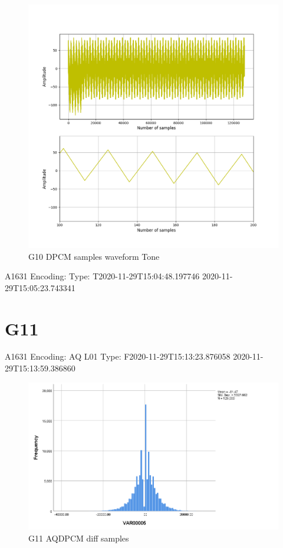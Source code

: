 \documentclass[hidelinks, 12pt, a4paper]{article}
\begin{document}
\begin{figure}[h!]
\centering
	\includegraphics[height=.38\textheight, width=\textwidth]{assets/session2/g10.png}
    \caption{G10 DPCM samples waveform Tone}
\end{figure}
A1631
Encoding: 
Type: T2020-11-29T15:04:48.197746
2020-11-29T15:05:23.743341


\section{G11}

A1631
Encoding: AQ L01
Type: F2020-11-29T15:13:23.876058
2020-11-29T15:13:59.386860
\begin{figure}[h!]
\centering
	\includegraphics[height=.38\textheight, width=\textwidth]{assets/session2/g11.png}
    \caption{G11 AQDPCM diff samples}
\end{figure}
\end{document}
